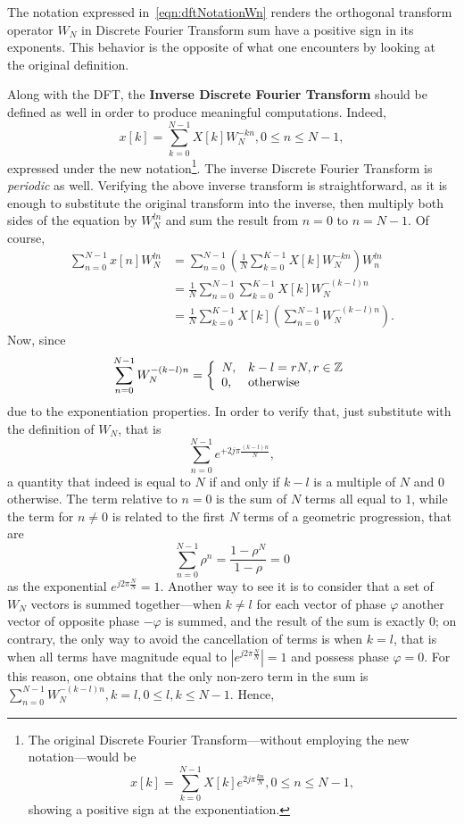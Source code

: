 \documentclass[\documentfontsize, twocolumn]{\classname}
\begin{document}
The notation expressed in~\ref{eqn:dftNotationWn} renders the orthogonal transform operator $W_N$ in Discrete Fourier Transform sum have a positive sign in its exponents. This behavior is the opposite of what one encounters by looking at the original definition.

Along with the DFT, the \textbf{Inverse Discrete Fourier Transform} should be defined as well in order to produce meaningful computations. Indeed,
\begin{equation}\label{eqn:inverseDiscreteFourierTransformWn}
    x[k] = \sum_{k=0}^{N-1} X[k] W_N^{-kn}, 0 \leq n \leq N-1,
\end{equation}
expressed under the new notation\footnote{
    The original Discrete Fourier Transform---without employing the new notation---would be
    \[
        x[k] = \sum_{k=0}^{N-1} X[k] e^{2j\pi\frac{kn}{N}}, 0 \leq n \leq N-1,
    \]
    showing a positive sign at the exponentiation.
}. The inverse Discrete Fourier Transform is \emph{periodic} as well.
Verifying the above inverse transform is straightforward, as it is enough to substitute the original transform into the inverse, then multiply both sides of the equation by $W_N^{ln}$ and sum the result from $n=0$ to $n=N-1$. Of course,
\begin{align*}
    \sum_{n=0}^{N-1} x[n] W_N^{ln}
    &= \sum_{n=0}^{N-1}\left(\frac 1 N\sum_{k=0}^{K-1} X[k] W_N^{-kn}\right)W_n^{ln}\\
    &= \frac 1 N \sum_{n=0}^{N-1}\sum_{k=0}^{K-1} X[k] W_N^{-(k-l)n}\\
    &= \frac 1 N \sum_{k=0}^{K-1} X[k] \left(\sum_{n=0}^{N-1}W_N^{-(k-l)n}\right).
\end{align*}
Now, since
\begin{equation}\label{eqn:dftWnProperty}
    \sum_{n=0}^{N-1}W_N^{-(k-l)n} = \left\{\begin{array}{ll} N, & k - l = rN, r \in \mathbb Z\\ 0, & \mbox{otherwise}\end{array}\right.
\end{equation}
due to the exponentiation properties. In order to verify that, just substitute with the definition of $W_N$, that is \[\sum_{n=0}^{N-1}e^{+2j\pi\frac{(k-l)n}{N}},\] a quantity that indeed is equal to $N$ if and only if $k-l$ is a multiple of $N$ and $0$ otherwise. The term relative to $n=0$ is the sum of $N$ terms all equal to $1$, while the term for $n\neq 0$ is related to the first $N$ terms of a geometric progression, that are \[\sum_{n=0}^{N-1}\rho^n = \frac{1-\rho^N}{1 - \rho} = 0\] as the exponential $e^{j2\pi\frac{N}{N}} = 1$. Another way to see it is to consider that a set of $W_N$ vectors is summed together---when $k\neq l$ for each vector of phase $\varphi$ another vector of opposite phase $-\varphi$ is summed, and the result of the sum is exactly $0$; on contrary, the only way to avoid the cancellation of terms is when $k = l$, that is when all terms have magnitude equal to $|e^{j2\pi\frac{N}{N}}| = 1$ and possess phase $\varphi = 0$. For this reason, one obtains that the only non-zero term in the sum is $\sum_{n=0}^{N-1} W_N^{-(k-l)n}, k=l, 0\leq l,k \leq N-1$. Hence,
\end{document}
